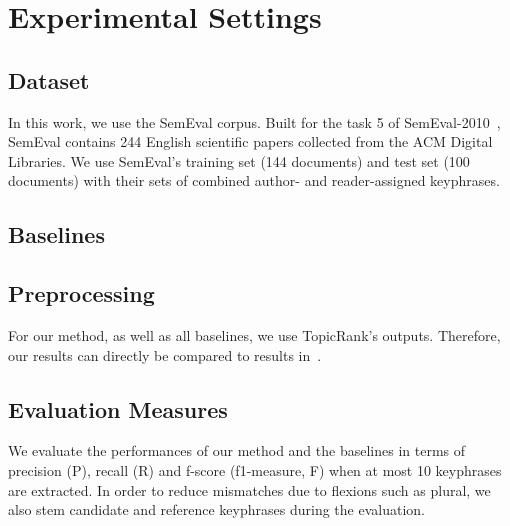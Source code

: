 \section{Experimental Settings}
\label{sec:experimental_settings}
  \subsection{Dataset}
  \label{subsec:dataset}
    In this work, we use the SemEval corpus. Built for the task 5 of
    SemEval-2010~\cite{kim2010semeval}, Sem\-Eval contains 244 English
    scientific papers collected from the ACM Digital Libraries. We use SemEval's
    training set (144 documents) and test set (100 documents) with their sets of
    combined author- and reader-assigned keyphrases.

  \subsection{Baselines}
  \label{subsec:baselines}

  \subsection{Preprocessing}
  \label{subsec:preprocessing}
    For our method, as well as all baselines, we use Topic\-Rank's outputs.
    Therefore, our results can directly be compared to results
    in~\cite{bougouin2013topicrank}.

  \subsection{Evaluation Measures}
  \label{subsec:evaluation_measures}
    We evaluate the performances of our method and the baselines in terms of
    precision (P), recall (R) and f-score (f1-measure, F) when at most 10
    keyphrases are extracted. In order to reduce mismatches due to flexions such
    as plural, we also stem candidate and reference keyphrases during the
    evaluation.

